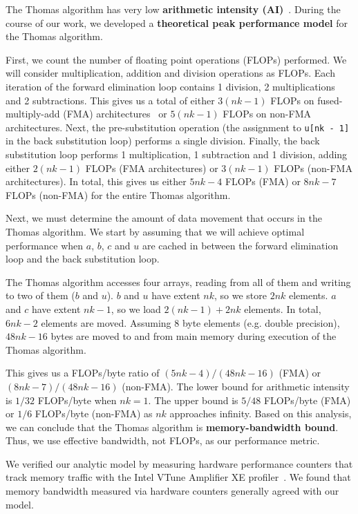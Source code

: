 \documentclass[10pt, conference, compsocconf]{IEEEtran}
\begin{document}
The Thomas algorithm has very low
  \textbf{arithmetic intensity (AI)}~\cite{roofline}.
During the course of our work, we developed a \textbf{theoretical peak
  performance model} for the Thomas algorithm.

First, we count the number of floating point operations (FLOPs) performed.
We will consider multiplication, addition and division operations as FLOPs.
Each iteration of the forward elimination loop contains 1 division, 2
  multiplications and 2 subtractions.
This gives us a total of either \(3(nk-1)\) FLOPs on fused-multiply-add (FMA)
  architectures~\cite{intel_sw_dev_manual_2c} or 
  \(5(nk-1)\) FLOPs on non-FMA architectures.
Next, the pre-substitution operation (the assignment to \lstinline{u[nk - 1]}
  in the back substitution loop) performs a single division.
Finally, the back substitution loop performs 1 multiplication, 1
  subtraction and 1 division, adding either \(2(nk-1)\) FLOPs (FMA architectures)
  or \(3(nk-1)\) FLOPs (non-FMA architectures).
In total, this gives us either \(5nk-4\) FLOPs (FMA) or \(8nk-7\) FLOPs
  (non-FMA) for the entire Thomas algorithm.

Next, we must determine the amount of data movement that occurs in the Thomas
  algorithm.
We start by assuming that we will achieve optimal performance when
  \(a\), \(b\), \(c\) and \(u\) are cached in between the forward elimination
  loop and the back substitution loop.

The Thomas algorithm accesses four arrays, reading from all of them and writing
  to two of them (\(b\) and \(u\)).
\(b\) and \(u\) have extent \(nk\), so we store \(2nk\) elements.
\(a\) and \(c\) have extent \(nk-1\), so we load \(2(nk-1)+2nk\) elements.
In total, \(6nk-2\) elements are moved.
Assuming 8 byte elements (e.g. double precision), \(48nk-16\) bytes are moved to
  and from main memory during execution of the Thomas algorithm.

This gives us a FLOPs/byte ratio of \((5nk-4)/(48nk-16)\) (FMA) or
  \((8nk-7)/(48nk-16)\) (non-FMA).
The lower bound for arithmetic intensity is \(1/32\)
  FLOPs/byte when \(nk=1\). 
The upper bound is \(5/48\) FLOPs/byte (FMA) or \(1/6\) FLOPs/byte (non-FMA) as
  \(nk\) approaches infinity.
Based on this analysis, we can conclude that the Thomas algorithm is
  \textbf{memory-bandwidth bound}.
Thus, we use effective bandwidth, not FLOPs, as our performance metric.

We verified our analytic model by measuring hardware performance counters that
  track memory traffic with the Intel VTune Amplifier XE
  profiler~\cite{intel_vtune_amplifier}.
We found that memory bandwidth measured via hardware counters generally agreed
  with our model. 
\end{document}
